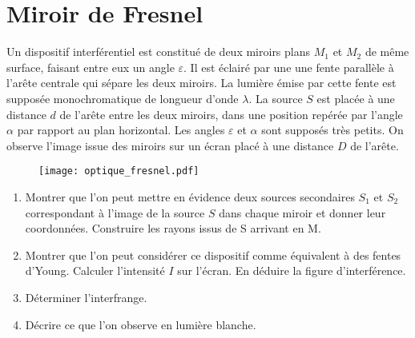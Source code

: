 \newpage

\section{Miroir de Fresnel}

Un dispositif interférentiel est constitué de deux miroirs plans $M_1$ et $M_2$ de même surface, faisant entre eux un angle $\varepsilon$. Il est éclairé par une une fente parallèle à l'arête centrale qui sépare les deux miroirs. La lumière émise par cette fente est supposée monochromatique de longueur d'onde $\lambda$. La source $S$ est placée à une distance $d$ de l'arête entre les deux miroirs, dans une position repérée par l'angle $\alpha$ par rapport au plan horizontal. Les angles $\varepsilon$ et $\alpha$ sont supposés très petits. On observe l'image issue des miroirs sur un écran placé à une distance $D$ de l'arête.

\begin{figure}[h]
\centering
  \texttt{[image: optique\_fresnel.pdf]}
\end{figure}

\begin{enumerate}

	\item Montrer que l'on peut mettre en évidence deux sources secondaires $S_1$ et $S_2$ correspondant à l'image de la source $S$ dans chaque miroir et donner leur coordonnées. Construire les rayons issus de S arrivant en M.
	
	\item Montrer que l'on peut considérer ce dispositif comme équivalent à des fentes d'Young. Calculer l'intensité $I$ sur l'écran. En déduire la figure d'interférence.
	
	\item Déterminer l'interfrange.
	
	\item Décrire ce que l'on observe en lumière blanche.

\end{enumerate}

\newpage

